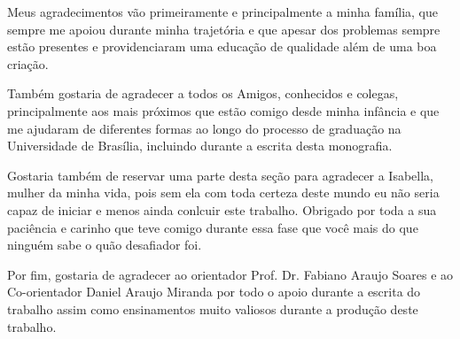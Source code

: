 \begin{agradecimentos}
Meus agradecimentos vão primeiramente e principalmente a minha família, que sempre me apoiou durante minha trajetória e que apesar dos problemas sempre estão presentes e providenciaram uma educação de qualidade além de uma boa criação.

Também gostaria de agradecer a todos os Amigos, conhecidos e colegas, principalmente aos mais próximos que estão comigo desde minha infância e que me ajudaram de diferentes formas ao longo do processo de graduação na Universidade de Brasília, incluindo durante a escrita desta monografia.

Gostaria também de reservar uma parte desta seção para agradecer a Isabella, mulher da minha vida, pois sem ela com toda certeza deste mundo eu não seria capaz de iniciar e menos ainda conlcuir este trabalho. Obrigado por toda a sua paciência e carinho que teve comigo durante essa fase que você mais do que ninguém sabe o quão desafiador foi.

Por fim, gostaria de agradecer ao orientador Prof. Dr. Fabiano Araujo Soares e ao Co-orientador Daniel Araujo Miranda por todo o apoio durante a escrita do trabalho assim como ensinamentos muito valiosos durante a produção deste trabalho.
\end{agradecimentos}
